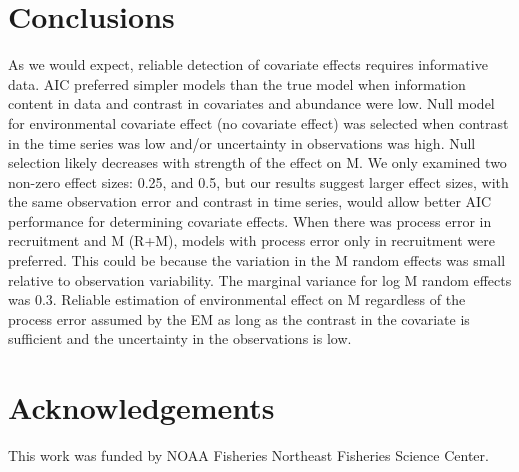 \documentclass[
  12pt,
]{article}
\newlength{\cslhangindent}
\newlength{\cslentryspacingunit} %
\newenvironment{CSLReferences}[2] %
 {%
  \setlength{\parindent}{0pt}
  \ifodd #1
  \let\oldpar\par
  \def\par{\hangindent=\cslhangindent\oldpar}
  \fi
  \setlength{\parskip}{#2\cslentryspacingunit}
 }%
 {}
\begin{document}
\hypertarget{conclusions}{%
\section*{Conclusions}\label{conclusions}}

As we would expect, reliable detection of covariate effects requires
informative data. AIC preferred simpler models than the true model when
information content in data and contrast in covariates and abundance
were low. Null model for environmental covariate effect (no covariate
effect) was selected when contrast in the time series was low and/or
uncertainty in observations was high. Null selection likely decreases
with strength of the effect on M. We only examined two non-zero effect
sizes: 0.25, and 0.5, but our results suggest larger effect sizes, with
the same observation error and contrast in time series, would allow
better AIC performance for determining covariate effects. When there was
process error in recruitment and M (R+M), models with process error only
in recruitment were preferred. This could be because the variation in
the M random effects was small relative to observation variability. The
marginal variance for log M random effects was 0.3. Reliable estimation
of environmental effect on M regardless of the process error assumed by
the EM as long as the contrast in the covariate is sufficient and the
uncertainty in the observations is low.

\hypertarget{acknowledgements}{%
\section*{Acknowledgements}\label{acknowledgements}}

This work was funded by NOAA Fisheries Northeast Fisheries Science
Center.

\pagebreak



\hypertarget{refs}{}
\begin{CSLReferences}{0}{0}
\end{CSLReferences}

\pagebreak
\end{document}

